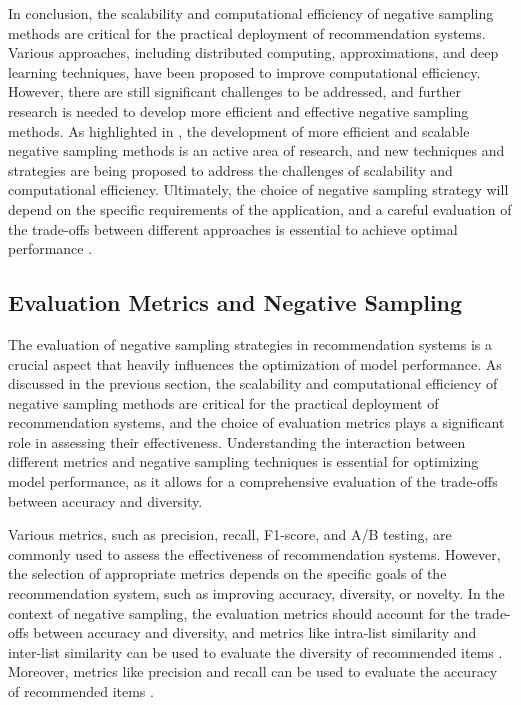 \documentclass[11pt,a4paper]{article}
\begin{document}
In conclusion, the scalability and computational efficiency of negative sampling methods are critical for the practical deployment of recommendation systems. Various approaches, including distributed computing, approximations, and deep learning techniques, have been proposed to improve computational efficiency. However, there are still significant challenges to be addressed, and further research is needed to develop more efficient and effective negative sampling methods. As highlighted in \cite{doi:10.1007/978-1-0716-2197-4_2}, the development of more efficient and scalable negative sampling methods is an active area of research, and new techniques and strategies are being proposed to address the challenges of scalability and computational efficiency. Ultimately, the choice of negative sampling strategy will depend on the specific requirements of the application, and a careful evaluation of the trade-offs between different approaches is essential to achieve optimal performance \cite{doi:10.1007/978-1-0716-2197-4_4}.


\subsection{Evaluation Metrics and Negative Sampling}


The evaluation of negative sampling strategies in recommendation systems is a crucial aspect that heavily influences the optimization of model performance. As discussed in the previous section, the scalability and computational efficiency of negative sampling methods are critical for the practical deployment of recommendation systems, and the choice of evaluation metrics plays a significant role in assessing their effectiveness. Understanding the interaction between different metrics and negative sampling techniques is essential for optimizing model performance, as it allows for a comprehensive evaluation of the trade-offs between accuracy and diversity.

Various metrics, such as precision, recall, F1-score, and A/B testing, are commonly used to assess the effectiveness of recommendation systems. However, the selection of appropriate metrics depends on the specific goals of the recommendation system, such as improving accuracy, diversity, or novelty. In the context of negative sampling, the evaluation metrics should account for the trade-offs between accuracy and diversity, and metrics like intra-list similarity and inter-list similarity can be used to evaluate the diversity of recommended items \cite{doi:10.1155/2009/421425}. Moreover, metrics like precision and recall can be used to evaluate the accuracy of recommended items \cite{doi:10.1209/0295-5075/82/58007}.
\end{document}

